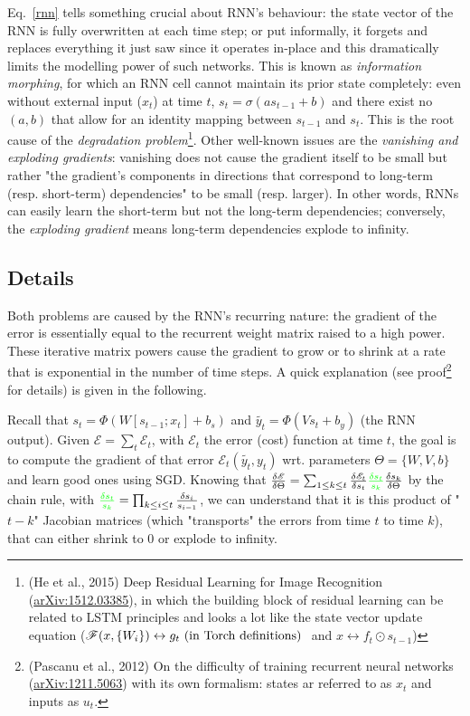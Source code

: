 \documentclass{article}
\begin{document}
Eq.~\ref{rnn} tells something crucial about RNN's behaviour: the state vector of the RNN is fully overwritten at each time step; or put informally, it forgets and replaces everything it just saw since it operates in-place and this dramatically limits the modelling power of such networks. This is known as \textit{information morphing}, for which an RNN cell cannot maintain its prior state completely: even without external input ($x_t$) at time $t$, $s_t=\sigma(a s_{t-1}+b)$ and there exist no $(a,b)$ that allow for an identity mapping between $s_{t-1}$ and $s_t$. This is the root cause of the \textit{degradation problem}\footnote{(He et al., 2015) Deep Residual Learning for Image Recognition (\href{https://arxiv.org/abs/1512.03385}{arXiv:1512.03385}), in which the building block of residual learning can be related to LSTM principles and looks a lot like the state vector update equation ($\mathcal{F}(x,\{W_i\}) \leftrightarrow g_t\textmd{ (in Torch definitions) }$ and $x \leftrightarrow f_t \odot s_{t-1}$)}. Other well-known issues are the \textit{vanishing and exploding gradients}: vanishing does not cause the gradient itself to be small but rather "the gradient's components in directions that correspond to long-term (resp. short-term) dependencies" to be small (resp. larger). In other words, RNNs can easily learn the short-term but not the long-term dependencies; conversely, the \textit{exploding gradient} means long-term dependencies explode to infinity.

\subsection{Details}
Both problems are caused by the RNN's recurring nature: the gradient of the error is essentially equal to the recurrent weight matrix raised to a high power. These iterative matrix powers cause the gradient to grow or to shrink at a rate that is exponential in the number of time steps. A quick explanation (see proof\footnote{(Pascanu et al., 2012) On the difficulty of training recurrent neural networks (\href{https://arxiv.org/abs/1211.5063}{arXiv:1211.5063}) with its own formalism: states ar referred to as $x_{t}$ and inputs as $u_t$.} for details) is given in the following. %

Recall that $s_t=\Phi(W [s_{t-1}; x_t] +b_s)$ and $\widetilde{y_t}=\Phi(V s_t + b_y)$ (the RNN output). Given $\mathcal{E}=\sum_t \mathcal{E}_t$, with $\mathcal{E}_t$ the error (cost) function at time $t$, the goal is to compute the gradient of that error $\mathcal{E}_t(\widetilde{y_t}, y_t)$ wrt. parameters $\Theta=\{W, V, b\}$ and learn good ones using SGD. Knowing that $\frac{\delta\mathcal{E}}{\delta \Theta}=\sum_{1\leq k \leq t} \frac{\delta\mathcal{E}_t}{\delta s_t} \textcolor{green}{\frac{\delta s_t}{s_k}} \frac{\delta s_k}{\delta \Theta}$ by the chain rule, with $\textcolor{green}{\frac{\delta s_t}{s_k}}=\prod_{k \leq i \leq t}\frac{\delta s_i}{s_{i-1}}$, we can understand that it is this product of "$t-k$" Jacobian matrices (which "transports" the errors from time $t$ to time $k$), that can either shrink to 0 or explode to infinity.
\end{document}
